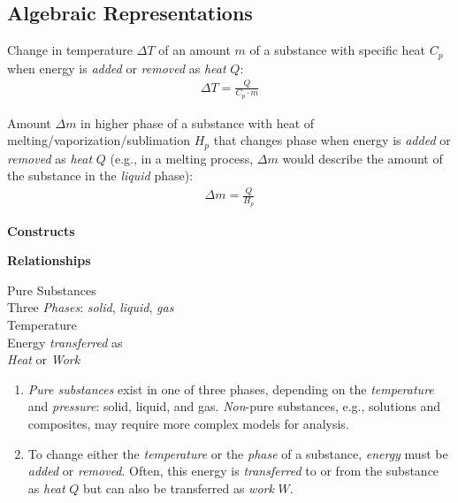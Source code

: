 \subsection*{Algebraic Representations}

\noindent Change in temperature $\Delta T$ of an amount $m$ of a substance with specific heat $C_p$ when energy is \emph{added} or \emph{removed} as \emph{heat} $Q$:
\begin{align*}
	\Delta T = \frac{Q}{C_p \cdot m}
\end{align*}

\noindent Amount $\Delta m$ in higher phase of a substance with heat of melting/vaporization/sublimation $H_p$ that changes phase when energy is \emph{added} or \emph{removed} as \emph{heat} $Q$ (e.g., in a melting process, $\Delta m$ would describe the amount of the substance in the \emph{liquid} phase):
\begin{align*}
	\Delta m = \frac{Q}{H_p}
\end{align*}


\pagebreak


\newcommand{\leftcolumn}{0.35\linewidth}
\newcommand{\rightcolumn}{0.65\linewidth}

\noindent
\parbox[b]{\leftcolumn}{
	\textbf{Constructs}}
\parbox[b]{\rightcolumn}{
	\textbf{Relationships}}

\noindent
\hrulefill

\noindent
\begin{minipage}[c]{\leftcolumn}
	\baselineskip
	Pure Substances\\
	Three \emph{Phases}: \emph{solid}, \emph{liquid}, \emph{gas}\\
	Temperature\\
	Energy \emph{transferred} as\\
	\hspace*{5mm}\emph{Heat} or \emph{Work}
\end{minipage}
\begin{minipage}[c]{\rightcolumn}
	\begin{enumerate}
		\item {\em Pure substances} exist in one of three phases, depending on the \emph{temperature} and \emph{pressure}: solid, liquid, and gas. {\em Non}-pure substances, e.g., solutions and composites, may require more complex models for analysis.
		\item To change either the \emph{temperature} or the \emph{phase} of a substance, \emph{energy} must be \emph{added} or \emph{removed}. Often, this energy is \emph{transferred} to or from the substance as \emph{heat} $Q$ but can also be transferred as \emph{work} $W$.\\[0.2mm]
	\end{enumerate}
\end{minipage}


